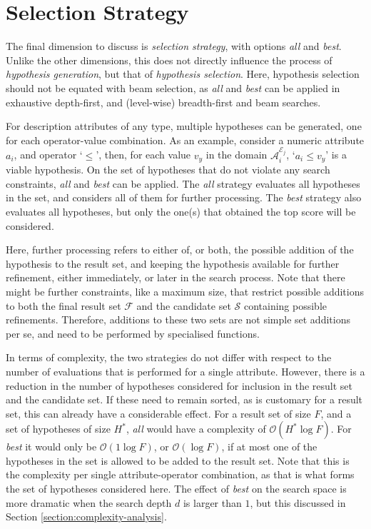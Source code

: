 \documentclass[smallextended]{svjour3}
\newcommand{\subgroup}[1]{\mbox{`$#1$'}}
\newcommand{\op}[1]{`$#1$'}
\newcommand{\extension}[1]{\mathcal{E}_{#1}}
\newcommand{\dimension}{\emph}
\newcommand{\parameter}{\emph}
\newcommand{\all}{\parameter{all}}
\newcommand{\best}{\parameter{best}}
\begin{document}
\section{Selection Strategy}
\label{section:selection-strategy}

The final dimension to discuss is \dimension{selection strategy}, with options \all{} and \best{}.
Unlike the other dimensions, this does not directly influence the process of \emph{hypothesis generation}, but that of \emph{hypothesis selection}.
Here, hypothesis selection should not be equated with beam selection, as \all{} and \best{} can be applied in exhaustive depth-first, and (level-wise) breadth-first and beam searches.

For description attributes of any type, multiple hypotheses can be generated, one for each operator-value combination.
As an example, consider a numeric attribute $a_i$, and operator \op{\leq}, then, for each value $v_y$ in the domain $\mathcal{A}_i^{\extension{j}}$, \subgroup{a_i \leq v_y} is a viable hypothesis.
On the set of hypotheses that do not violate any search constraints, \all{} and \best{} can be applied.
The \all{} strategy evaluates all hypotheses in the set, and considers all of them for further processing.
The \best{} strategy also evaluates all hypotheses, but only the one(s) that obtained the top score will be considered.

Here, further processing refers to either of, or both, the possible addition of the hypothesis to the result set, and keeping the hypothesis available for further refinement, either immediately, or later in the search process.
Note that there might be further constraints, like a maximum size, that restrict possible additions to both the final result set $\mathcal{F}$ and the candidate set $\mathcal{S}$ containing possible refinements.
Therefore, additions to these two sets are not simple set additions per se, and need to be performed by specialised functions.

In terms of complexity, the two strategies do not differ with respect to the number of evaluations that is performed for a single attribute.
However, there is a reduction in the number of hypotheses considered for inclusion in the result set and the candidate set.
If these need to remain sorted, as is customary for a result set, this can already have a considerable effect.
For a result set of size $F$, and a set of hypotheses of size $H^*$, \all{} would have a complexity of $\mathcal{O}(H^* \log{} F)$.
For \best{} it would only be $\mathcal{O}(1 \log{} F)$, or $\mathcal{O}(\log{} F)$, if at most one of the hypotheses in the set is allowed to be added to the result set.
Note that this is the complexity per single attribute-operator combination, as that is what forms the set of hypotheses considered here.
The effect of \best{} on the search space is more dramatic when the search depth $d$ is larger than $1$, but this discussed in Section \ref{section:complexity-analysis}.
\end{document}
